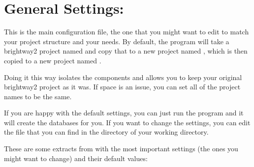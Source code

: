 \documentclass[letterpaper,10pt,english]{sphinxmanual}
\begin{document}
\section{General Settings: }
\label{\detokenize{configuration:general-settings-user-settings-py}}
\sphinxAtStartPar
This is the main configuration file, the one that you might want to edit to match your project structure and your needs. By default, the program will take a brightway2 project named  and copy that to a new project named , which is then copied to a new project named .

\sphinxAtStartPar
Doing it this way isolates the components and allows you to keep your original brightway2 project as it was. If space is an issue, you can set all of the project names to be the same.

\sphinxAtStartPar
If you are happy with the default settings, you can just run the program and it will create the databases for you. If you want to change the settings, you can edit the  file that you can find in the  directory of your working directory.

\sphinxAtStartPar
These are some extracts from  with the most important settings (the ones you might want to change) and their default values:
\end{document}
